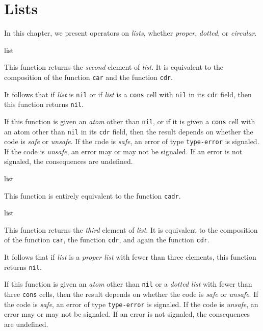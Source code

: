 \chapter{Lists}

In this chapter, we present operators on \emph{lists}, whether
\emph{proper}, \emph{dotted}, or \emph{circular}.  

 {list}

This function returns the \emph{second} element of \textit{list}.  It
is equivalent to the composition of the function \texttt{car} and the
function \texttt{cdr}.  

It follows that if \textit{list} is \texttt{nil} or if \textit{list}
is a \texttt{cons} cell with \texttt{nil} in its \texttt{cdr} field,
then this function returns \texttt{nil}.  

If this function is given an \emph{atom} other than \texttt{nil}, or
if it is given a \texttt{cons} cell with an atom other than
\texttt{nil} in its \texttt{cdr} field, then the result depends on
whether the code is \emph{safe} or \emph{unsafe}.  If the code is
\emph{safe}, an error of type \texttt{type-error} is signaled.  If the
code is \emph{unsafe}, an error may or may not be signaled.  If an
error is not signaled, the consequences are undefined.

 {list}

This function is entirely equivalent to the function \texttt{cadr}. 

 {list}

This function returns the \emph{third} element of \textit{list}.  It
is equivalent to the composition of the function \texttt{car}, the
function \texttt{cdr}, and again the function \texttt{cdr}.

It follows that if \textit{list} is a \emph{proper list} with fewer
than three elements, this function returns \texttt{nil}.

If this function is given an \emph{atom} other than \texttt{nil} or a
\emph{dotted list} with fewer than three \texttt{cons} cells, then the
result depends on whether the code is \emph{safe} or \emph{unsafe}.
If the code is \emph{safe}, an error of type \texttt{type-error} is
signaled.  If the code is \emph{unsafe}, an error may or may not be
signaled.  If an error is not signaled, the consequences are
undefined.
